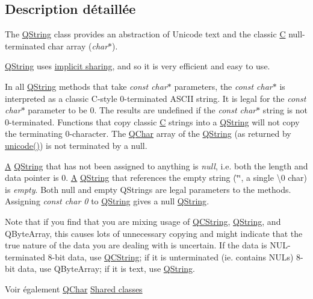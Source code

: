 \subsection{Description détaillée}
The \hyperlink{class_q_string}{Q\+String} class provides an abstraction of Unicode text and the classic \hyperlink{class_c}{C} null-\/terminated char array ({\itshape char$\ast$}). 

\hyperlink{class_q_string}{Q\+String} uses \hyperlink{}{implicit sharing}, and so it is very efficient and easy to use.

In all \hyperlink{class_q_string}{Q\+String} methods that take {\itshape const char$\ast$} parameters, the {\itshape const char$\ast$} is interpreted as a classic C-\/style 0-\/terminated A\+S\+C\+I\+I string. It is legal for the {\itshape const char$\ast$} parameter to be 0. The results are undefined if the {\itshape const char$\ast$} string is not 0-\/terminated. Functions that copy classic \hyperlink{class_c}{C} strings into a \hyperlink{class_q_string}{Q\+String} will not copy the terminating 0-\/character. The \hyperlink{class_q_char}{Q\+Char} array of the \hyperlink{class_q_string}{Q\+String} (as returned by \hyperlink{class_q_string_a90243c19cde0be976d0f498db7f7e53a}{unicode()}) is not terminated by a null.

\hyperlink{class_a}{A} \hyperlink{class_q_string}{Q\+String} that has not been assigned to anything is {\itshape null}, i.\+e. both the length and data pointer is 0. \hyperlink{class_a}{A} \hyperlink{class_q_string}{Q\+String} that references the empty string (\char`\"{}\char`\"{}, a single \textquotesingle{}\textbackslash{}0\textquotesingle{} char) is {\itshape empty}. Both null and empty Q\+Strings are legal parameters to the methods. Assigning {\itshape const char 0} to \hyperlink{class_q_string}{Q\+String} gives a null \hyperlink{class_q_string}{Q\+String}.

Note that if you find that you are mixing usage of \hyperlink{class_q_c_string}{Q\+C\+String}, \hyperlink{class_q_string}{Q\+String}, and Q\+Byte\+Array, this causes lots of unnecessary copying and might indicate that the true nature of the data you are dealing with is uncertain. If the data is N\+U\+L-\/terminated 8-\/bit data, use \hyperlink{class_q_c_string}{Q\+C\+String}; if it is unterminated (ie. contains N\+U\+Ls) 8-\/bit data, use Q\+Byte\+Array; if it is text, use \hyperlink{class_q_string}{Q\+String}.

\begin{DoxySeeAlso}{Voir également}
\hyperlink{class_q_char}{Q\+Char} \hyperlink{}{Shared classes} 
\end{DoxySeeAlso}


